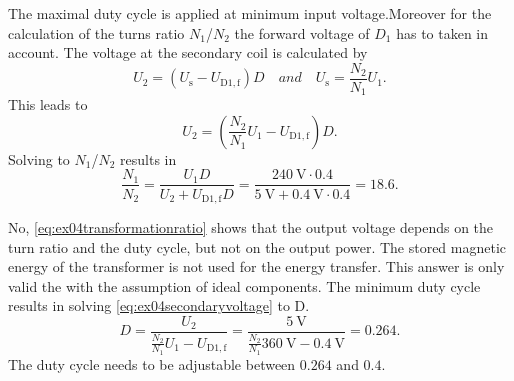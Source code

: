\begin{solutionblock}
    The maximal duty cycle is applied at minimum input voltage.Moreover for the calculation of the 
    turns ratio $N_\mathrm{1}$/$N_\mathrm{2}$ the forward voltage of $D_\mathrm{1}$ has to taken in account.
    The voltage at the secondary coil is calculated by
    \begin{equation}
        U_\mathrm{2}=\left(U_\mathrm{s}-U_\mathrm{D1,f}\right) D \quad and \quad 
        U_\mathrm{s}=\frac{N_\mathrm{2}}{N_\mathrm{1}}U_\mathrm{1}.
        \label{eq:ex04transformationratio}        
    \end{equation}
    This leads to
    \begin{equation}
        U_\mathrm{2}=\left(\frac{N_\mathrm{2}}{N_\mathrm{1}}U_\mathrm{1}-U_\mathrm{D1,f}\right) D.
        \label{eq:ex04secondaryvoltage}  
    \end{equation}
    Solving to $N_\mathrm{1}$/$N_\mathrm{2}$ results in
    \begin{equation}
        \frac{N_\mathrm{1}}{N_\mathrm{2}}=\frac{U_\mathrm{1}D}{U_\mathrm{2}+ U_\mathrm{D1,f}D}
        =\frac{\SI{240}{\volt}\cdot 0.4}{\SI{5}{\volt}+\SI{0.4}{\volt} \cdot 0.4 }=18.6.
    \end{equation}
\end{solutionblock}



\begin{solutionblock}
    No, \eqref{eq:ex04transformationratio} shows that the output voltage depends on the turn ratio and the duty cycle,
    but not on the output power. The stored magnetic energy of the transformer is not used for the energy transfer.
    This answer is only valid the with the assumption of ideal components. 
    The minimum duty cycle results in solving \eqref{eq:ex04secondaryvoltage} to D.
    \begin{equation}
        D=\frac{U_\mathrm{2}}{\frac{N_\mathrm{2}}{N_\mathrm{1}}U_\mathrm{1}-U_\mathrm{D1,f}}=
        \frac{\SI{5}{\volt}}{\frac{N_\mathrm{2}}{N_\mathrm{1}}\SI{360}{\volt}-\SI{0.4}{\volt}}=0.264.
    \end{equation}
    The duty cycle needs to be adjustable between $0.264$ and $0.4$.
\end{solutionblock}
         
